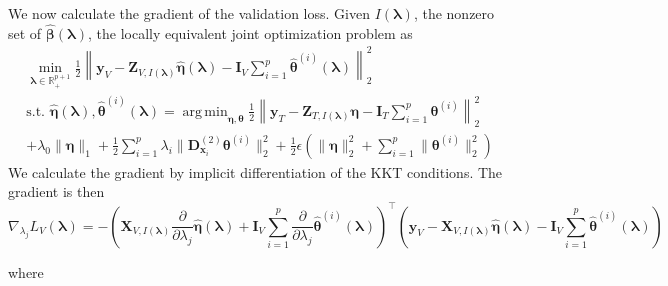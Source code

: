 \documentclass[12pt,letterpaper]{article}
\DeclareMathOperator*{\argmin}{arg\,min}
\begin{document}
We now calculate the gradient of the validation loss. Given $I(\boldsymbol \lambda)$, the nonzero set of $\hat{\boldsymbol{\beta}}(\boldsymbol{\lambda})$, the locally equivalent joint optimization problem as
\begin{equation}
\begin{array}{c}
\min_{\boldsymbol\lambda \in \mathbb{R}^{p+1}_{+}} \frac{1}{2}
\left \|
\boldsymbol{y}_V
- \boldsymbol{Z}_{V, I(\boldsymbol \lambda)} \hat{\boldsymbol{\eta}}(\boldsymbol{\lambda})
- \boldsymbol{I}_V \sum_{i=1}^p \hat{\boldsymbol{\theta}}^{(i)}(\boldsymbol{\lambda})
\right \|^2_2 \\
\text{s.t. }
\hat{\boldsymbol{\eta}}(\boldsymbol{\lambda}),
\hat{\boldsymbol{\theta}}^{(i)}(\boldsymbol{\lambda}) =
\argmin_{\boldsymbol \eta, \boldsymbol{\theta}}
\frac{1}{2} \left \|
\boldsymbol{y}_T
- \boldsymbol{Z}_{T, I(\boldsymbol \lambda)}\boldsymbol{\eta}
- \boldsymbol{I}_T \sum_{i=1}^p \boldsymbol{\theta}^{(i)} \right \|^2_2 \\
+ \lambda_0 \| \boldsymbol{\eta} \|_1
+ \frac{1}{2} \sum_{i=1}^p \lambda_i \| \boldsymbol{D}_{\boldsymbol{x}_i}^{(2)} \boldsymbol{\theta}^{(i)} \|_2^2
+ \frac{1}{2} \epsilon \left( \| \boldsymbol{\eta} \|_2^2 + \sum_{i=1}^p \| \boldsymbol{\theta}^{(i)} \|_2^2 \right )
\end{array}
\label{aplmRestricted}
\end{equation}
We calculate the gradient by implicit differentiation of the KKT conditions. The gradient is then
\begin{equation*}
\nabla_{\lambda_j} L_V(\boldsymbol{\lambda}) =
- \left(
\boldsymbol{X}_{V, I(\boldsymbol\lambda)} \frac{\partial}{\partial \lambda_j} \hat{\boldsymbol\eta}(\boldsymbol{\lambda})
+ \boldsymbol{I}_V \sum_{i=1}^p \frac{\partial}{\partial \lambda_j} \hat{\boldsymbol\theta}^{(i)}(\boldsymbol{\lambda})
\right )^\top
\left (
\boldsymbol{y}_V
- \boldsymbol{X}_{V, I(\boldsymbol\lambda)} \hat{\boldsymbol\eta}(\boldsymbol{\lambda})
- \boldsymbol{I}_V \sum_{i=1}^p \hat{\boldsymbol\theta}^{(i)}(\boldsymbol{\lambda})
\right )
\end{equation*}

where
\end{document}
